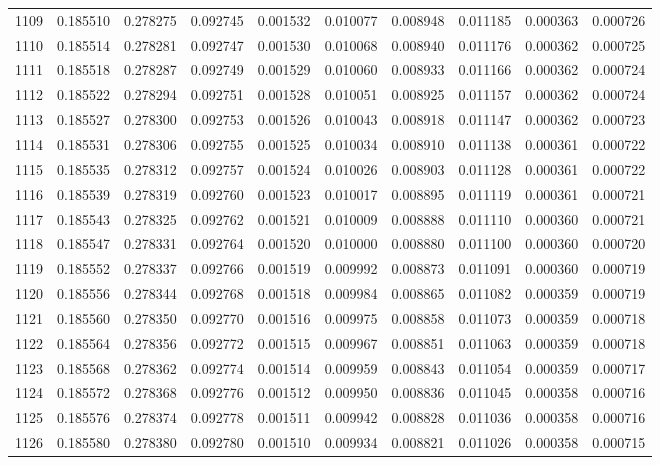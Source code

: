 \begin{tabular}{lrrrrrrrrr}
1109 & 0.185510 & 0.278275 & 0.092745 & 0.001532 & 0.010077 & 0.008948 & 0.011185 & 0.000363 & 0.000726 \\
1110 & 0.185514 & 0.278281 & 0.092747 & 0.001530 & 0.010068 & 0.008940 & 0.011176 & 0.000362 & 0.000725 \\
1111 & 0.185518 & 0.278287 & 0.092749 & 0.001529 & 0.010060 & 0.008933 & 0.011166 & 0.000362 & 0.000724 \\
1112 & 0.185522 & 0.278294 & 0.092751 & 0.001528 & 0.010051 & 0.008925 & 0.011157 & 0.000362 & 0.000724 \\
1113 & 0.185527 & 0.278300 & 0.092753 & 0.001526 & 0.010043 & 0.008918 & 0.011147 & 0.000362 & 0.000723 \\
1114 & 0.185531 & 0.278306 & 0.092755 & 0.001525 & 0.010034 & 0.008910 & 0.011138 & 0.000361 & 0.000722 \\
1115 & 0.185535 & 0.278312 & 0.092757 & 0.001524 & 0.010026 & 0.008903 & 0.011128 & 0.000361 & 0.000722 \\
1116 & 0.185539 & 0.278319 & 0.092760 & 0.001523 & 0.010017 & 0.008895 & 0.011119 & 0.000361 & 0.000721 \\
1117 & 0.185543 & 0.278325 & 0.092762 & 0.001521 & 0.010009 & 0.008888 & 0.011110 & 0.000360 & 0.000721 \\
1118 & 0.185547 & 0.278331 & 0.092764 & 0.001520 & 0.010000 & 0.008880 & 0.011100 & 0.000360 & 0.000720 \\
1119 & 0.185552 & 0.278337 & 0.092766 & 0.001519 & 0.009992 & 0.008873 & 0.011091 & 0.000360 & 0.000719 \\
1120 & 0.185556 & 0.278344 & 0.092768 & 0.001518 & 0.009984 & 0.008865 & 0.011082 & 0.000359 & 0.000719 \\
1121 & 0.185560 & 0.278350 & 0.092770 & 0.001516 & 0.009975 & 0.008858 & 0.011073 & 0.000359 & 0.000718 \\
1122 & 0.185564 & 0.278356 & 0.092772 & 0.001515 & 0.009967 & 0.008851 & 0.011063 & 0.000359 & 0.000718 \\
1123 & 0.185568 & 0.278362 & 0.092774 & 0.001514 & 0.009959 & 0.008843 & 0.011054 & 0.000359 & 0.000717 \\
1124 & 0.185572 & 0.278368 & 0.092776 & 0.001512 & 0.009950 & 0.008836 & 0.011045 & 0.000358 & 0.000716 \\
1125 & 0.185576 & 0.278374 & 0.092778 & 0.001511 & 0.009942 & 0.008828 & 0.011036 & 0.000358 & 0.000716 \\
1126 & 0.185580 & 0.278380 & 0.092780 & 0.001510 & 0.009934 & 0.008821 & 0.011026 & 0.000358 & 0.000715 \\

\end{tabular}
